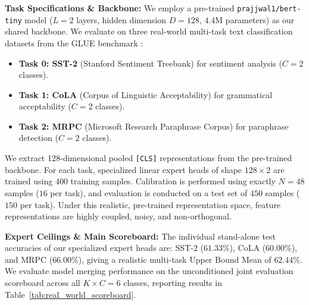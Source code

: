 \textbf{Task Specifications \& Backbone:} We employ a pre-trained \texttt{prajjwal1/bert-tiny} model \cite{prajjwal2019bert} ($L=2$ layers, hidden dimension $D=128$, $4.4$M parameters) as our shared backbone. We evaluate on three real-world multi-task text classification datasets from the GLUE benchmark \cite{wang2018glue}:
\begin{itemize}
    \item \textbf{Task 0: SST-2} (Stanford Sentiment Treebank) for sentiment analysis ($C=2$ classes).
    \item \textbf{Task 1: CoLA} (Corpus of Linguistic Acceptability) for grammatical acceptability ($C=2$ classes).
    \item \textbf{Task 2: MRPC} (Microsoft Research Paraphrase Corpus) for paraphrase detection ($C=2$ classes).
\end{itemize}
We extract 128-dimensional pooled \texttt{[CLS]} representations from the pre-trained backbone. For each task, specialized linear expert heads of shape $128 \times 2$ are trained using $400$ training samples. Calibration is performed using exactly $N = 48$ samples ($16$ per task), and evaluation is conducted on a test set of $450$ samples ($150$ per task). Under this realistic, pre-trained representation space, feature representations are highly coupled, noisy, and non-orthogonal.

\textbf{Expert Ceilings \& Main Scoreboard:} The individual stand-alone test accuracies of our specialized expert heads are: SST-2 ($61.33\%$), CoLA ($60.00\%$), and MRPC ($66.00\%$), giving a realistic multi-task Upper Bound Mean of $62.44\%$. We evaluate model merging performance on the unconditioned joint evaluation scoreboard across all $K \times C = 6$ classes, reporting results in Table~\ref{tab:real_world_scoreboard}.

\begin{table}[h]
\caption{Real-world multi-task scoreboard and stream heterogeneity audit on GLUE datasets using a pre-trained BERT-Tiny backbone. All values are percentages (\%).}
\label{tab:real_world_scoreboard}
\vskip 0.15in
\begin{center}
\begin{small}
\begin{sc}
\end{sc}
\end{small}
\end{center}
\vskip -0.1in
\end{table}

